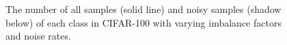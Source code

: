 \documentclass[letterpaper]{article} %
\begin{document}
\begin{figure}[t]
\centering
{}%
%
\centering
\caption{
The number of all samples (solid line) and noisy samples (shadow below) of each class in CIFAR-100 with varying imbalance factors and noise rates.
}
\label{fig:imb_noise_0}
\end{figure}
\end{document}
